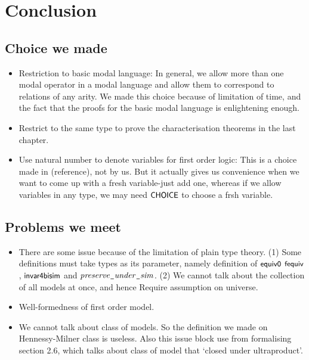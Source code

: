 \documentclass[letterpaper]{article}
\renewcommand{\HOLConst}[1]{{\textsf{\upshape\small #1}}}
\renewcommand{\HOLinline}[1]{\ensuremath{#1}}
\begin{document}
\section{Conclusion}

\subsection{Choice we made}

\begin{itemize}
\item Restriction to basic modal language: In general, we allow more than one modal operator in a modal language and allow them to correspond to relations of any arity. We made this choice because of limitation of time, and the fact that the proofs for the basic modal language is enlightening enough.

\item Restrict to the same type to prove the characterisation theorems in the last chapter.

\item Use natural number to denote variables for first order logic: This is a choice made in (reference), not by us. But it actually gives us convenience when we want to come up with a fresh variable-just add one, whereas if we allow variables in any type, we may need \HOLinline{\HOLConst{CHOICE}} to choose a frsh variable.

\end{itemize}

\subsection{Problems we meet}

\begin{itemize}

\item There are some issue because of the limitation of plain type theory.
      (1) Some definitions must take types as its parameter, namely definition of \HOLinline{\HOLConst{equiv0}} \HOLinline{\HOLConst{fequiv}}, \HOLinline{\HOLConst{invar4bisim}} and \HOLinline{\HOLFreeVar{preserve\HOLTokenUnderscore{}under\HOLTokenUnderscore{}sim}}. 
      (2) We cannot talk about the collection of all models at once, and hence  Require assumption on universe. 

\item Well-formedness of first order model.

\item We cannot talk about class of models. So the definition we made on Hennessy-Milner class is useless. Also this issue block use from formalising section 2.6, which talks about class of model that `closed under ultraproduct'. 
\end{itemize}
\end{document}

